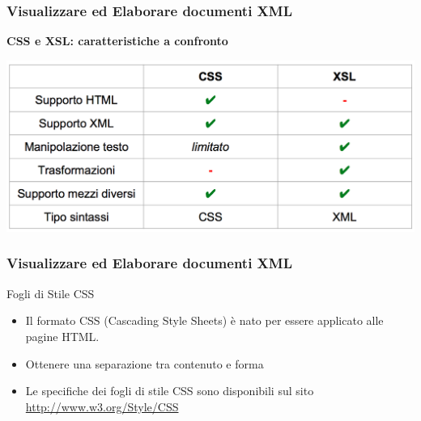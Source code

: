 \documentclass{beamer}
\begin{document}
    \begin{frame}
        \frametitle{Visualizzare ed Elaborare documenti XML}
        \addtocounter{nframe}{1}
        \begin{center}
            \textbf{CSS e XSL: caratteristiche a confronto}
        \end{center}
       
        \begin{center}
            \includegraphics[width=.9\textwidth]{imgs/css-xsl.png}
        \end{center}
    
    \end{frame}

    \begin{frame}
        \frametitle{Visualizzare ed Elaborare documenti XML}
        \addtocounter{nframe}{1}
        
        \begin{block}{Fogli di Stile CSS}
           
           \begin{itemize}
               \item Il formato CSS (Cascading Style Sheets) è nato per essere applicato alle pagine HTML.
               \item Ottenere una separazione tra contenuto e forma
               \item Le specifiche dei fogli di stile CSS sono disponibili sul sito \url{http://www.w3.org/Style/CSS}
           \end{itemize}
        \end{block}
        
    \end{frame}
\end{document}
